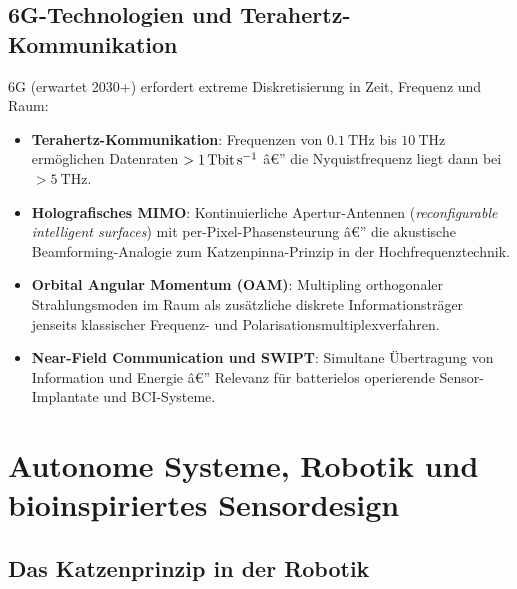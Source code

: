 ﻿\documentclass[12pt,a4paper,titlepage]{report}
\begin{document}
\subsection{6G-Technologien und Terahertz-Kommunikation}

6G (erwartet 2030+) erfordert extreme Diskretisierung in Zeit, Frequenz und Raum:
\begin{itemize}[leftmargin=2em]
    \item \textbf{Terahertz-Kommunikation}: Frequenzen von $\SI{0.1}{\tera\hertz}$
        bis $\SI{10}{\tera\hertz}$ ermöglichen Datenraten $> \SI{1}{\tera\bit\per\second}$ â€”
        die Nyquistfrequenz liegt dann bei $> \SI{5}{\tera\hertz}$.
    \item \textbf{Holografisches MIMO}: Kontinuierliche Apertur-Antennen
        (\emph{reconfigurable intelligent surfaces}) mit per-Pixel-Phasensteurung â€”
        die akustische Beamforming-Analogie zum Katzenpinna-Prinzip in der Hochfrequenztechnik.
    \item \textbf{Orbital Angular Momentum (OAM)}: Multipling orthogonaler
        Strahlungsmoden im Raum als zusätzliche diskrete Informationsträger jenseits
        klassischer Frequenz- und Polarisationsmultiplexverfahren.
    \item \textbf{Near-Field Communication und SWIPT}: Simultane Übertragung von
        Information und Energie â€” Relevanz für batterielos operierende
        Sensor-Implantate und BCI-Systeme.
\end{itemize}

\section{Autonome Systeme, Robotik und bioinspiriertes Sensordesign}

\subsection{Das Katzenprinzip in der Robotik}
\end{document}

